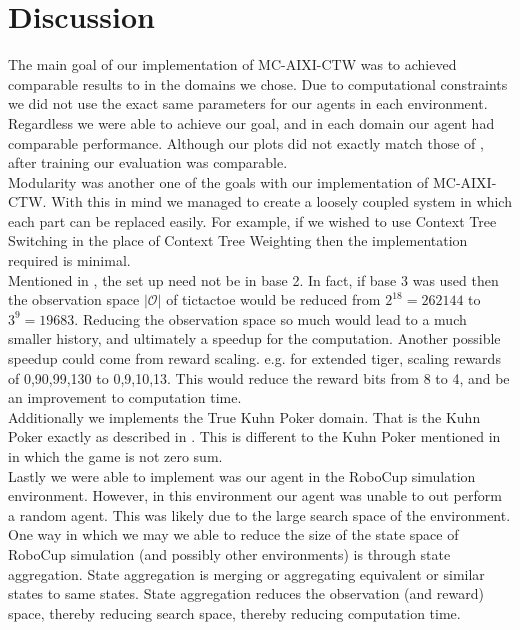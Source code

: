 \documentclass{article}
\theoremstyle{definition}
\newtheorem{primary statistics}[definition]{Primary Statistics}
\newtheorem{auxiliary statistics}[definition]{Auxiliary Statistics}
\begin{document}
\newpage

\section{Discussion}


The main goal of our implementation of MC-AIXI-CTW was to achieved comparable results to \citep{veness2011monte} in the domains we chose. Due to computational constraints we did not use the exact same parameters for our agents in each environment. Regardless we were able to achieve our goal, and in each domain our agent had comparable performance. Although our plots did not exactly match those of \citep{veness2011monte}, after training our evaluation was comparable. \\

Modularity was another one of the goals with our implementation of MC-AIXI-CTW. With this in mind we managed to create a loosely coupled system in which each part can be replaced easily. For example, if we wished to use Context Tree Switching \citep{veness2012context} in the place of Context Tree Weighting then the implementation required is minimal. \\

Mentioned in \citep{veness2011monte}, the set up need not be in base 2. In fact, if base 3 was used then the observation space $|\mathcal{O}|$ of tictactoe would be reduced from $2^{18}=262144$ to $3^9 = 19683$. Reducing the observation space so much would lead to a much smaller history, and ultimately a speedup for the computation. Another possible speedup could come from reward scaling.  e.g. for extended tiger, scaling rewards of 0,90,99,130 to 0,9,10,13. This would reduce the reward bits from 8 to 4, and be an improvement to computation time. \\

Additionally we implements the True Kuhn Poker domain. That is the Kuhn Poker exactly as described in \citep{kuhn1950simplified}. This is different to the Kuhn Poker mentioned in  \citep{veness2011monte} in which the game is not zero sum. \\

Lastly we were able to implement was our agent in the RoboCup simulation environment. However, in this environment our agent was unable to out perform a random agent. This was likely due to the large search space of the environment. One way in which we may we able to reduce the size of the state space of RoboCup simulation (and possibly other environments) is through state aggregation. State aggregation is merging or aggregating equivalent or similar states to same states. State aggregation reduces the observation (and reward) space, thereby reducing search space, thereby reducing computation time.
\end{document}
